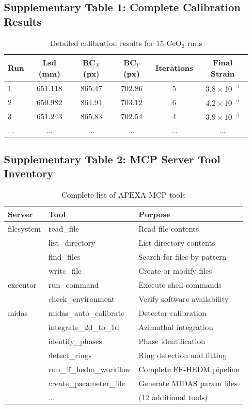 \documentclass[11pt]{article}
\begin{document}
\subsection{Supplementary Table 1: Complete Calibration Results}

\begin{table}[H]
\centering
\caption{Detailed calibration results for 15 CeO$_2$ runs}
\begin{tabular}{lccccc}
\toprule
Run & Lsd (mm) & BC$_X$ (px) & BC$_Y$ (px) & Iterations & Final Strain \\
\midrule
1 & 651.118 & 865.47 & 702.86 & 5 & $3.8 \times 10^{-5}$ \\
2 & 650.982 & 864.91 & 703.12 & 6 & $4.2 \times 10^{-5}$ \\
3 & 651.243 & 865.83 & 702.54 & 4 & $3.9 \times 10^{-5}$ \\
... & ... & ... & ... & ... & ... \\
\bottomrule
\end{tabular}
\end{table}

\subsection{Supplementary Table 2: MCP Server Tool Inventory}

\begin{table}[H]
\centering
\caption{Complete list of APEXA MCP tools}
\begin{tabular}{lll}
\toprule
Server & Tool & Purpose \\
\midrule
filesystem & read\_file & Read file contents \\
 & list\_directory & List directory contents \\
 & find\_files & Search for files by pattern \\
 & write\_file & Create or modify files \\
executor & run\_command & Execute shell commands \\
 & check\_environment & Verify software availability \\
midas & midas\_auto\_calibrate & Detector calibration \\
 & integrate\_2d\_to\_1d & Azimuthal integration \\
 & identify\_phases & Phase identification \\
 & detect\_rings & Ring detection and fitting \\
 & run\_ff\_hedm\_workflow & Complete FF-HEDM pipeline \\
 & create\_parameter\_file & Generate MIDAS param files \\
 & ... & (12 additional tools) \\
\bottomrule
\end{tabular}
\end{table}
\end{document}

